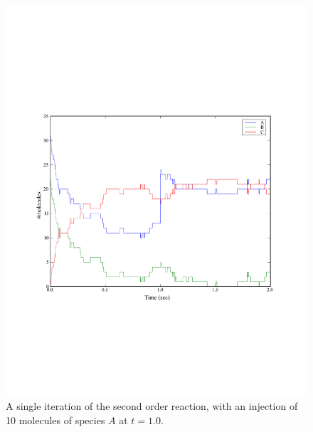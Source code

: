 \documentclass[a4paper,12pt]{book}
\begin{document}
\begin{figure}
\centering
\includegraphics[width=13cm]{chap02_secondorderreaction03.pdf}
\caption{A single iteration of the second order reaction, with an injection of 10 molecules of species $A$ at $t=1.0$.}
\label{fig:chap02:secondorderreaction03}
\end{figure}
\end{document}
